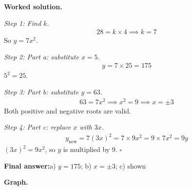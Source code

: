\documentclass[11pt]{article}
\begin{document}
\textbf{Worked solution.}

\textit{Step 1: Find \( k \).}
\[\begin{gathered}
28 = k \times 4 \implies k = 7
\end{gathered}\]
So \( y = 7x^2 \).

\textit{Step 2: Part a: substitute \( x = 5 \).}
\[\begin{gathered}
y = 7 \times 25 = 175
\end{gathered}\]
\( 5^2 = 25 \).

\textit{Step 3: Part b: substitute \( y = 63 \).}
\[\begin{gathered}
63 = 7x^2 \implies x^2 = 9 \implies x = \pm 3
\end{gathered}\]
Both positive and negative roots are valid.

\textit{Step 4: Part c: replace \( x \) with \( 3x \).}
\[\begin{gathered}
y_{\text{new}} = 7(3x)^2 = 7 \times 9x^2 = 9 \times 7x^2 = 9y
\end{gathered}\]
\( (3x)^2 = 9x^2 \), so \( y \) is multiplied by 9. \( \square \)

\begin{answerbox}
\textbf{Final answer:}\quad a) \(\displaystyle y = 175\); b) \(\displaystyle x = \pm 3\); c) shown
\end{answerbox}
\textbf{Graph.}
\end{document}
